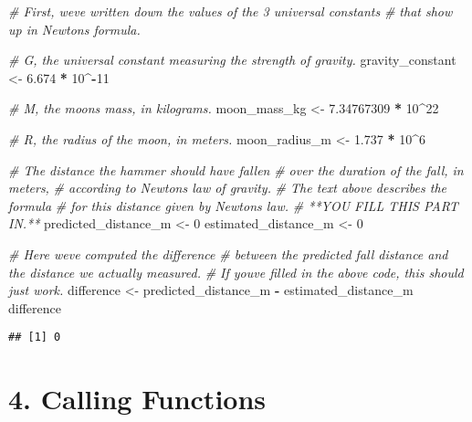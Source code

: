 \documentclass[
]{article}
\newenvironment{Shaded}{\begin{snugshade}}{\end{snugshade}}
\newcommand{\CommentTok}[1]{\textcolor[rgb]{0.56,0.35,0.01}{\textit{#1}}}
\newcommand{\DecValTok}[1]{\textcolor[rgb]{0.00,0.00,0.81}{#1}}
\newcommand{\FloatTok}[1]{\textcolor[rgb]{0.00,0.00,0.81}{#1}}
\newcommand{\NormalTok}[1]{#1}
\newcommand{\OtherTok}[1]{\textcolor[rgb]{0.56,0.35,0.01}{#1}}
\newcommand{\SpecialCharTok}[1]{\textcolor[rgb]{0.81,0.36,0.00}{\textbf{#1}}}
\begin{document}
\begin{Shaded}
\begin{Highlighting}[]
\CommentTok{\# First, we\textquotesingle{}ve written down the values of the 3 universal constants }
\CommentTok{\# that show up in Newton\textquotesingle{}s formula.}

\CommentTok{\# G, the universal constant measuring the strength of gravity.}
\NormalTok{gravity\_constant }\OtherTok{\textless{}{-}} \FloatTok{6.674} \SpecialCharTok{*} \DecValTok{10}\SpecialCharTok{\^{}{-}}\DecValTok{11}

\CommentTok{\# M, the moon\textquotesingle{}s mass, in kilograms.}
\NormalTok{moon\_mass\_kg }\OtherTok{\textless{}{-}} \FloatTok{7.34767309} \SpecialCharTok{*} \DecValTok{10}\SpecialCharTok{\^{}}\DecValTok{22}

\CommentTok{\# R, the radius of the moon, in meters.}
\NormalTok{moon\_radius\_m }\OtherTok{\textless{}{-}} \FloatTok{1.737} \SpecialCharTok{*} \DecValTok{10}\SpecialCharTok{\^{}}\DecValTok{6}

\CommentTok{\# The distance the hammer should have fallen }
\CommentTok{\# over the duration of the fall, in meters, }
\CommentTok{\# according to Newton\textquotesingle{}s law of gravity.  }
\CommentTok{\# The text above describes the formula}
\CommentTok{\# for this distance given by Newton\textquotesingle{}s law.}
\CommentTok{\# **YOU FILL THIS PART IN.**}
\NormalTok{predicted\_distance\_m }\OtherTok{\textless{}{-}} \DecValTok{0}
\NormalTok{estimated\_distance\_m }\OtherTok{\textless{}{-}} \DecValTok{0}

\CommentTok{\# Here we\textquotesingle{}ve computed the difference }
\CommentTok{\# between the predicted fall distance and the distance we actually measured.}
\CommentTok{\# If you\textquotesingle{}ve filled in the above code, this should just work.}
\NormalTok{difference }\OtherTok{\textless{}{-}}\NormalTok{ predicted\_distance\_m }\SpecialCharTok{{-}}\NormalTok{ estimated\_distance\_m}
\NormalTok{difference}
\end{Highlighting}
\end{Shaded}

\begin{verbatim}
## [1] 0
\end{verbatim}

\section{4. Calling Functions}\label{calling-functions}
\end{document}
